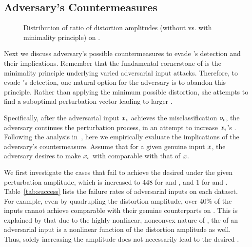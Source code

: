 \subsection{Adversary's Countermeasures}
\label{sec:sec2}

\begin{figure}
\hspace{-15pt}
\caption{Distribution of ratio of distortion amplitudes (without vs. with minimality principle) on \svhn. \label{fig:pratio}}
\end{figure}

Next we discuss adversary's possible countermeasures to evade \system's detection and their implications. Remember that the fundamental cornerstone of \system is the minimality principle underlying varied adversarial input attacks. Therefore, to evade \system's detection, one natural option for the adversary is to abandon this principle. Rather than applying the minimum possible distortion, she attempts to find a suboptimal perturbation vector leading to larger \ars.
%
%
%

Specifically, after the adversarial input $x_{\epsilon}$ achieves the misclassification $o_\epsilon$, the adversary continues the perturbation process, in an attempt to increase $x_{\epsilon}$'s \ar. Following the analysis in~, here we empirically evaluate the implications of the adversary's countermeasure. Assume that for a given genuine input $x$, the adversary desires to make $x_{\epsilon}$ with \ar comparable with that of $x$.

We first investigate the cases that fail to achieve the desired \ar under the given perturbation amplitude, which is increased to 448 for \ttp and \ttca, and 1 for \ttg and \ttha. Table~\ref{tab:success} lists the failure rates of adversarial inputs on each dataset. For example, even by quadrupling the distortion amplitude, over 40\% of the inputs cannot achieve \ars comparable with their genuine counterparts on \cifar. This is explained by that due to the highly nonlinear, nonconvex nature of \dnns, the \ar of an adversarial input is a nonlinear function of the distortion amplitude as well. Thus, solely increasing the amplitude does not necessarily lead to the desired \ar.





